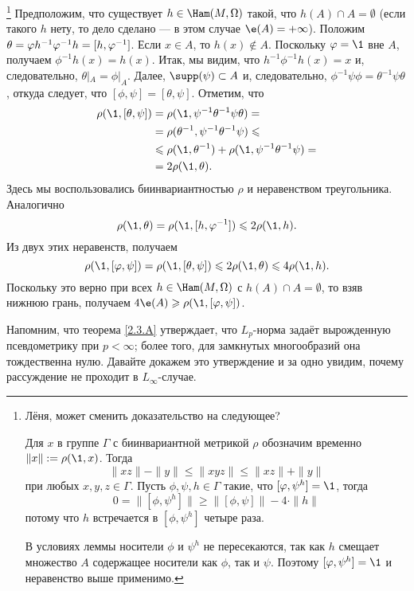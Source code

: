 %
\footnote{Лёня, может сменить доказательство на следующее?

Для $x$ в группе $\Gamma$ с биинвариантной метрикой $\rho$ обозначим
временно $\|x\|\z\df\rho(\1,x)$.
Тогда
\[
\|xz\| - \|y\|\leq\|xyz\|\leq\|xz\| + \|y\|
\]
при любых $x,y,z\in \Gamma$.
Пусть $\phi,\psi,h\in \Gamma$ такие, что $[\phi,\psi^{h}]=\1$, тогда
\[
0=\big\|[\phi,\psi^{h}]\big\|
\geq
\big\|[\phi,\psi]\big\| - 4\cdot\|h\|
\]
потому что $h$ встречается в $[\phi,\psi^{h}]$ четыре раза.

В условиях леммы носители $\phi$ и $\psi^{h}$ не пересекаются,
так как $h$ смещает множество $A$ содержащее носители как $\phi$, так и
$\psi$.
Поэтому $[\phi,\psi^{h}]=\1$ и неравенство выше применимо.
\qeds
}
Предположим, что существует $h \in \Ham (M, \Omega)$ такой, что $h (A) \cap A = \emptyset$ (если такого $h$ нету, то дело сделано --- в этом случае $\e (A) = + \infty$).
Положим $\theta = \phi h^{-1} \phi^{-1} h \z= [h, \phi^{-1}]$.
Если $x \in A$, то $h (x) \notin A$.
Поскольку $\phi = \1$ вне $A$, получаем $\phi^{-1} h (x) = h (x)$.
Итак, мы видим, что $h^{-1} \phi^{-1} h (x) = x$ и, следовательно, $\theta|_A = \phi|_A$.
Далее, $\supp (\psi) \subset A$ и, следовательно, $\phi^{-1} \psi\phi = \theta^{-1} \psi\theta$, откуда следует, что $[\phi, \psi] = [\theta, \psi]$.
Отметим, что 
\begin{align*}
\rho (\1, [\theta, \psi]) &= \rho (\1, \psi^{-1} \theta^{-1} \psi\theta) =
\\
&=\rho (\theta^{-1}, \psi^{-1} \theta^{-1} \psi) \le
\\
&\le \rho (\1, \theta^{-1}) + \rho (\1, \psi^{-1} \theta^{-1} \psi) =
\\
&= 2\rho (\1, \theta).
\end{align*}
Здесь мы воспользовались биинвариантностью $\rho$ и неравенством треугольника.
Аналогично 
\[\rho (\1, \theta) = \rho (\1, [h, \phi^{-1}]) \le 2\rho (\1, h).\]
Из двух этих неравенств, получаем 
\[\rho (\1, [\phi, \psi]) = \rho (\1, [\theta, \psi]) \le 2\rho (\1, \theta) \le 4\rho (\1, h).\]
Поскольку это верно при всех $h \in \Ham (M, \Omega)$ с $h (A) \cap A =\emptyset$, то взяв нижнюю грань, получаем $4\e (A) \ge \rho (\1, [\phi, \psi])$.
\qeds


Напомним, что теорема \ref{2.3.A} утверждает, что $L_p$-норма задаёт вырожденную псевдометрику при $p <\infty$;
более того, для замкнутых многообразий она тождественна нулю.
Давайте докажем это утверждение и за одно увидим, почему рассуждение не проходит в $L_\infty$-случае.


